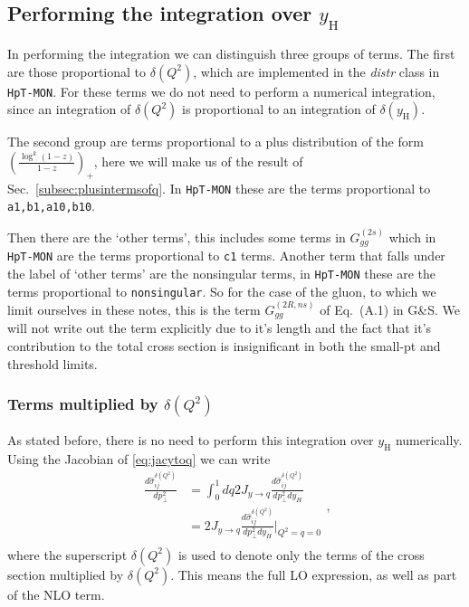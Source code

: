 \documentclass[10pt]{report}
\begin{document}
\subsection{Performing the integration over $y_\mathrm{H}$}
In performing the integration we can distinguish three groups of terms. The first are those proportional to $\delta(Q^2)$, which are implemented in the \textit{distr} class in \texttt{HpT-MON}. For these terms we do not need to perform a numerical integration, since an integration of $\delta(Q^2)$ is proportional to an integration of $\delta(y_\mathrm{H})$. 

The second group are terms proportional to a plus distribution of the form $\left( \frac{\log ^k (1-z) }{ 1-z } \right)_+$, here we will make us of the result of Sec.~\ref{subsec:plusintermsofq}. In \texttt{HpT-MON} these are the terms proportional to \texttt{a1,b1,a10,b10}.

Then there are the `other terms', this includes some terms in $G_{gg}^{(2s)}$ which in \texttt{HpT-MON} are the terms proportional to \texttt{c1} terms. Another term that falls under the label of `other terms' are the nonsingular terms, in \texttt{HpT-MON} these are the terms proportional to \texttt{nonsingular}. So for the case of the gluon, to which we limit ourselves in these notes, this is the term $G_{gg}^{(2R,ns)}$ of Eq.~(A.1) in G\&S. We will not write out the term explicitly due to it's length and the fact that it's contribution to the total cross section is insignificant in both the small-pt and threshold limits.


\subsubsection{Terms multiplied by $\delta(Q^2)$}
As stated before, there is no need to perform this integration over $y_\mathrm{H}$ numerically. Using the Jacobian of \eqref{eq:jacytoq} we can write 
\begin{equation}
\begin{aligned}
\frac{d \hat{\sigma}_{i j}^{\delta(Q^2)}}{d p_{\perp}^{2} } 
&= \int_0^1 dq 2 J_{y \rightarrow q} \frac{d \hat{\sigma}_{i j}^{\delta(Q^2)}}{d p_{\perp}^{2} d y_{H}} \\
&= 2 J_{y \rightarrow q} \frac{d \hat{\sigma}_{i j}^{\delta(Q^2)}}{d p_{\perp}^{2} d y_{H}} \Bigg|_{Q^2=q=0} \\
\end{aligned},
\end{equation}
where the superscript $\delta(Q^2)$ is used to denote only the terms of the cross section multiplied by $\delta(Q^2)$. This means the full LO expression, as well as part of the NLO term. 
\end{document}
